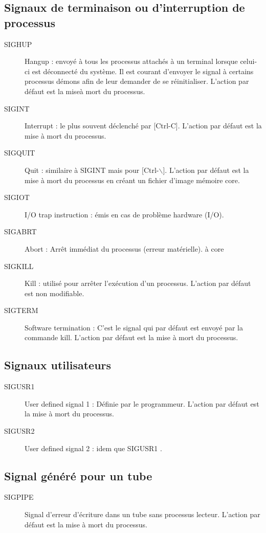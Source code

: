 \documentclass[10pt,french,A4]{article}
\theoremstyle{plain}
\begin{document}
\subsection{Signaux de terminaison ou d'interruption de processus}
\begin{description}
\item[SIGHUP] Hangup : envoyé à tous les processus attachés à un terminal lorsque celui-ci
est déconnecté du système. Il est courant d'envoyer le signal à certains
processus démons afin de leur demander de se réinitialiser. L'action par
défaut est la miseà mort du processus.
\item[SIGINT] Interrupt : le plus souvent déclenché par [Ctrl-C].
L'action par défaut est la mise à mort du processus.
\item[SIGQUIT] Quit : similaire à SIGINT mais pour [Ctrl-$\backslash$].
L'action par défaut est la mise à mort du processus en créant un fichier
d'image mémoire core.
\item[SIGIOT] I/O trap instruction : émis en cas de problème hardware (I/O). 
\item[SIGABRT] Abort : Arrêt immédiat du processus (erreur matérielle). à core
\item[SIGKILL] Kill : utilisé pour arrêter l'exécution d'un processus.
L'action par défaut est non modifiable.
\item[SIGTERM] Software termination : C'est le signal qui par défaut est envoyé par la
commande kill. L'action par défaut est la mise à mort du processus.
\end{description}

\subsection{Signaux utilisateurs}
\begin{description}
\item[SIGUSR1] User defined signal 1 : Définie par le programmeur. L'action par défaut est la
mise à mort du processus.
\item[SIGUSR2] User defined signal 2 : idem que SIGUSR1 .
\end{description}

\subsection{Signal généré pour un tube}
\begin{description}
    \item[SIGPIPE] Signal d'erreur d'écriture dans un tube sans processus lecteur.
    L'action par défaut est la mise à mort du processus.
\end{description}
\end{document}
